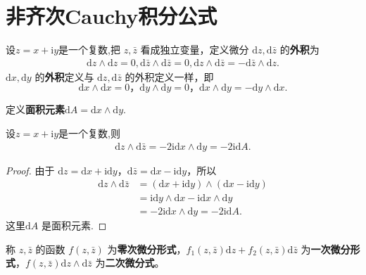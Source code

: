 \documentclass[../../main.tex]{subfiles}%
\begin{document}
\section{非齐次Cauchy积分公式}

\begin{definition}
设$z=x+\mathrm{i}y$是一个复数,把 \( z,\bar{z} \) 看成独立变量，定义微分 \( \mathrm{d}z,\mathrm{d}\bar{z} \) 的\textbf{外积}为
\begin{align*}
\mathrm{d}z \wedge \mathrm{d}z = 0, 
\mathrm{d}\bar{z} \wedge \mathrm{d}\bar{z} = 0, 
\mathrm{d}z \wedge \mathrm{d}\bar{z} = -\mathrm{d}\bar{z} \wedge \mathrm{d}z.
\end{align*}
\( \mathrm{d}x,\mathrm{d}y \) 的\textbf{外积}定义与 \( \mathrm{d}z,\mathrm{d}\bar{z} \) 的外积定义一样，即 
\[
\mathrm{d}x \wedge \mathrm{d}x = 0 ， \mathrm{d}y \wedge \mathrm{d}y = 0 ， \mathrm{d}x \wedge \mathrm{d}y = -\mathrm{d}y \wedge \mathrm{d}x .
\]

定义\textbf{面积元素}\( \mathrm{d}A =\mathrm{d}x \wedge \mathrm{d}y .\) 
\end{definition}

\begin{proposition}
设$z=x+\mathrm{i}y$是一个复数,则
\begin{align*}
\mathrm{d}z \wedge \mathrm{d}\bar{z} = -2\mathrm{i}\mathrm{d}x \wedge \mathrm{d}y = -2\mathrm{i}\mathrm{d}A.
\end{align*}
\end{proposition}
\begin{proof}

由于 \( \mathrm{d}z = \mathrm{d}x + \mathrm{i}\mathrm{d}y \)，\( \mathrm{d}\bar{z} = \mathrm{d}x - \mathrm{i}\mathrm{d}y \)，所以
\begin{align*}
\mathrm{d}z \wedge \mathrm{d}\bar{z} &= (\mathrm{d}x + \mathrm{i}\mathrm{d}y) \wedge (\mathrm{d}x - \mathrm{i}\mathrm{d}y) \\
&= \mathrm{i}\mathrm{d}y \wedge \mathrm{d}x - \mathrm{i}\mathrm{d}x \wedge \mathrm{d}y \\
&= -2\mathrm{i}\mathrm{d}x \wedge \mathrm{d}y = -2\mathrm{i}\mathrm{d}A.
\end{align*}
这里\( \mathrm{d}A \) 是面积元素.

\end{proof}

\begin{definition}
称 \( z,\bar{z} \) 的函数 \( f(z,\bar{z}) \) 为\textbf{零次微分形式}，\( f_1(z,\bar{z})\mathrm{d}z + f_2(z,\bar{z})\mathrm{d}\bar{z} \) 为\textbf{一次微分形式}，\( f(z,\bar{z})\mathrm{d}z \wedge \mathrm{d}\bar{z} \) 为\textbf{二次微分式}。
\end{definition}
\end{document}
